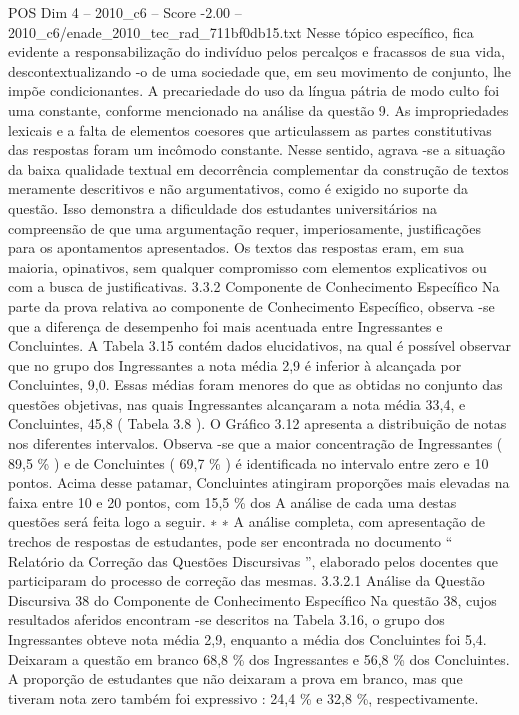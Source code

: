 \begin{textsample}{POS Dim 4 – 2010\_c6 – Score -2.00 – 2010\_c6/enade\_2010\_tec\_rad\_711bf0db15.txt}
Nesse tópico específico, fica evidente a responsabilização do indivíduo pelos percalços e fracassos de sua vida, descontextualizando -o de uma sociedade que, em seu movimento de conjunto, lhe impõe condicionantes.
A precariedade do uso da língua pátria de modo culto foi uma constante, conforme mencionado na análise da questão 9.
As impropriedades lexicais e a falta de elementos coesores que articulassem as partes constitutivas das respostas foram um incômodo constante.
Nesse sentido, agrava -se a situação da baixa qualidade textual em decorrência complementar da construção de textos meramente descritivos e não argumentativos, como é exigido no suporte da questão.
Isso demonstra a dificuldade dos estudantes universitários na compreensão de que uma argumentação requer, imperiosamente, justificações para os apontamentos apresentados.
Os textos das respostas eram, em sua maioria, opinativos, sem qualquer compromisso com elementos explicativos ou com a busca de justificativas. 3.3.2 Componente de Conhecimento Específico Na parte da prova relativa ao componente de Conhecimento Específico, observa -se que a diferença de desempenho foi mais acentuada entre Ingressantes e Concluintes.
A Tabela 3.15 contém dados elucidativos, na qual é possível observar que no grupo dos Ingressantes a nota média 2,9 é inferior à alcançada por Concluintes, 9,0.
Essas médias foram menores do que as obtidas no conjunto das questões objetivas, nas quais Ingressantes alcançaram a nota média 33,4, e Concluintes, 45,8 ( Tabela 3.8 ).
O Gráfico 3.12 apresenta a distribuição de notas nos diferentes intervalos.
Observa -se que a maior concentração de Ingressantes ( 89,5 \% ) e de Concluintes ( 69,7 \% ) é identificada no intervalo entre zero e 10 pontos.
Acima desse patamar, Concluintes atingiram proporções mais elevadas na faixa entre 10 e 20 pontos, com 15,5 \% dos A análise de cada uma destas questões será feita logo a seguir. ∗ ∗ A análise completa, com apresentação de trechos de respostas de estudantes, pode ser encontrada no documento “ Relatório da Correção das Questões Discursivas ”, elaborado pelos docentes que participaram do processo de correção das mesmas. 3.3.2.1 Análise da Questão Discursiva 38 do Componente de Conhecimento Específico Na questão 38, cujos resultados aferidos encontram -se descritos na Tabela 3.16, o grupo dos Ingressantes obteve nota média 2,9, enquanto a média dos Concluintes foi 5,4.
Deixaram a questão em branco 68,8 \% dos Ingressantes e 56,8 \% dos Concluintes.
A proporção de estudantes que não deixaram a prova em branco, mas que tiveram nota zero também foi expressivo : 24,4 \% e 32,8 \%, respectivamente.

\end{textsample}
